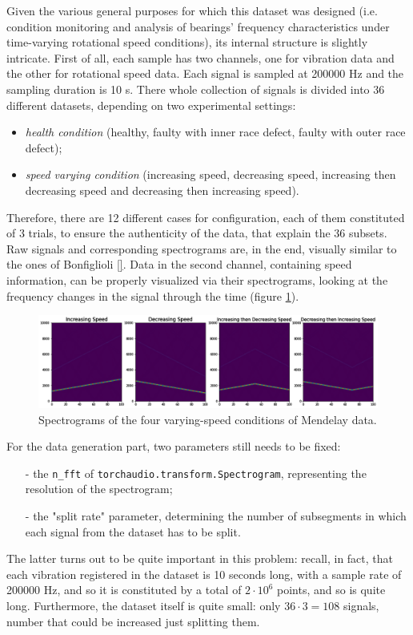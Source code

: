 \documentclass[../main.tex]{subfiles}
\begin{document}
Given the various general purposes for which this dataset was designed (i.e. condition monitoring and analysis of bearings' frequency characteristics under time-varying rotational speed conditions), its internal structure is slightly intricate. First of all, each sample has two channels, one for vibration data and the other for rotational speed data. Each signal is sampled at 200000 Hz and the sampling duration is 10 s. There whole collection of signals is divided into 36 different datasets, depending on two experimental settings:
\begin{itemize}
	\item \textit{health condition} (healthy, faulty with inner race defect, faulty with outer race defect);
	\item \textit{speed varying condition} (increasing speed, decreasing speed, increasing then decreasing speed and decreasing then increasing speed).
\end{itemize} 
Therefore, there are 12 different cases for configuration, each of them constituted of 3 trials, to ensure the authenticity of the data, that explain the 36 subsets. Raw signals and corresponding spectrograms are, in the end, visually similar to the ones of Bonfiglioli \ref{}. Data in the second channel, containing speed information, can be properly visualized via their spectrograms, looking at the frequency changes in the signal through the time (figure \ref{fig:mendelay_speed_changes}).
\begin{figure}[ht]
	\centering
	\includegraphics[width=\textwidth]{pictures/mendelay_speed_changes}
	\caption{Spectrograms of the four varying-speed conditions of Mendelay data.}
	\label{fig:mendelay_speed_changes}
\end{figure}
For the data generation part, two parameters still needs to be fixed:
\begin{itemize}
	\item[-] the \texttt{n\_fft} of \texttt{torchaudio.transform.Spectrogram}, representing the resolution of the spectrogram;
	\item[-] the "split rate" parameter, determining the number of subsegments in which each signal from the dataset has to be split.
\end{itemize}
The latter turns out to be quite important in this problem: recall, in fact, that each vibration registered in the dataset is 10 seconds long, with a sample rate of 200000 Hz, and so it is constituted by a total of $2\cdot 10^6$ points, and so is quite long. Furthermore, the dataset itself is quite small: only $36\cdot 3 = 108$ signals, number that could be increased just splitting them.
\end{document}
